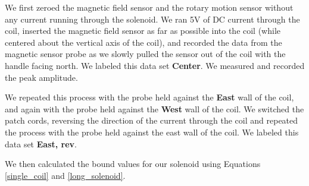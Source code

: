 We first zeroed the magnetic field sensor and the rotary motion sensor without any current running through the solenoid. We ran 5V of DC current through the coil, inserted the magnetic field sensor as far as possible into the coil (while centered about the vertical axis of the coil), and recorded the data from the magnetic sensor probe as we slowly pulled the sensor out of the coil with the handle facing north. We labeled this data set \textbf{Center}. We measured and recorded the peak amplitude.

\bigskip
We repeated this process with the probe held against the \textbf{East} wall of the coil, and again with the probe held against the \textbf{West} wall of the coil. We switched the patch cords, reversing the direction of the current through the coil and repeated the process with the probe held against the east wall of the coil. We labeled this data set \textbf{East, rev}.

\bigskip
We then calculated the bound values for our solenoid using Equations \ref{single_coil} and \ref{long_solenoid}.